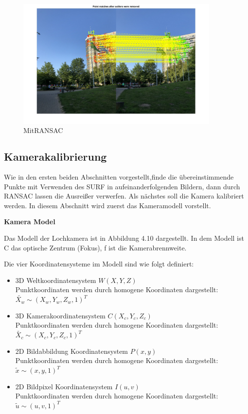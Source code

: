 \begin{figure}[H]
 \centering 
 \includegraphics[keepaspectratio,width=0.9\textwidth]{images/4_ZweiteErfahrung/RANSAC/MitRANSAC.pdf}
 \caption{MitRANSAC}
 \label{fig:MitRANSAC}
\end{figure} 


\subsection{Kamerakalibrierung}

Wie in den ersten beiden Abschnitten vorgestellt,finde  die übereinstimmende Punkte mit Verwenden des SURF in aufeinanderfolgenden Bildern, dann durch RANSAC lassen die Ausreißer verwerfen. Als nächstes soll die Kamera kalibriert werden. In diesem Abschnitt wird zuerst das Kameramodell vorstellt.

\textbf{Kamera Model}

Das Modell der Lochkamera ist in Abbildung 4.10 dargestellt. In dem Modell ist C das optische Zentrum (Fokus), f ist die Kamerabrennweite.

Die vier Koordinatensysteme im Modell sind wie folgt definiert:

\begin{itemize}
	\item 3D Weltkoordinatensystem $W(X,Y,Z)$ \\
	Punktkoordinaten werden durch homogene Koordinaten dargestellt: $\widetilde{X_w}\sim(X_w,Y_w,Z_w,1)^T$
	\item 3D Kamerakoordinatensystem $C(X_c,Y_c,Z_c)$\\
	Punktkoordinaten werden durch homogene Koordinaten dargestellt: $\widetilde{X_c}\sim(X_c,Y_c,Z_c,1)^T$
	\item 2D Bildabbildung Koordinatensystem $P(x,y)$\\
	Punktkoordinaten werden durch homogene Koordinaten dargestellt: $\widetilde{x}\sim(x,y,1)^T$
	\item 2D Bildpixel Koordinatensystem $I(u,v)$\\
	Punktkoordinaten werden durch homogene Koordinaten dargestellt: $\widetilde{u}\sim(u,v,1)^T$
\end{itemize}

